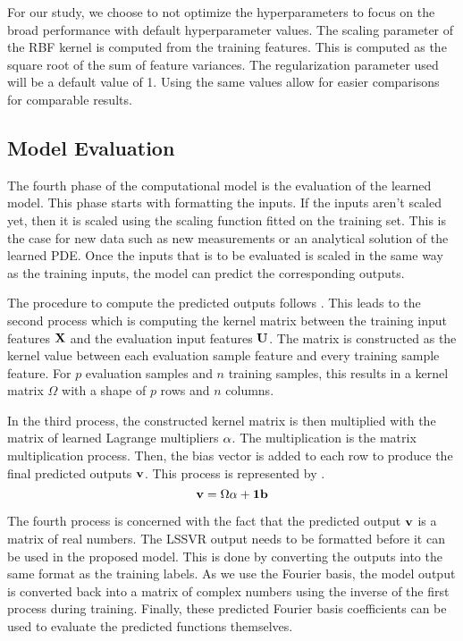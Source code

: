 For our study, we choose to not optimize the hyperparameters to focus on the broad performance with default hyperparameter values. The scaling parameter of the RBF kernel is computed from the training features. This is computed as the square root of the sum of feature variances. The regularization parameter used will be a default value of 1. Using the same values allow for easier comparisons for comparable results.

\subsection{Model Evaluation}
\noindent The fourth phase of the computational model is the evaluation of the learned model. This phase starts with formatting the inputs. If the inputs aren't scaled yet, then it is scaled using the scaling function fitted on the training set. This is the case for new data such as new measurements or an analytical solution of the learned PDE\@. Once the inputs that is to be evaluated is scaled in the same way as the training inputs, the model can predict the corresponding outputs.

The procedure to compute the predicted outputs follows . This leads to the second process which is computing the kernel matrix between the training input features \(\vb{X}\) and the evaluation input features \(\vb{U}\). The matrix is constructed as the kernel value between each evaluation sample feature and every training sample feature. For \(p \) evaluation samples and \(n \) training samples, this results in a kernel matrix \(\Omega \) with a shape of \(p \) rows and \(n \) columns.

In the third process, the constructed kernel matrix is then multiplied with the matrix of learned Lagrange multipliers \(\vb{\alpha}\). The multiplication is the matrix multiplication process. Then, the bias vector is added to each row to produce the final predicted outputs \(\vb{v}\). This process is represented by .
\begin{equation}
  \vb{v} = \Omega\vb{\alpha}+\vb{1}\vb{b} \label{eq:lssvr_prediction_vectorized}
\end{equation}

The fourth process is concerned with the fact that the predicted output \(\vb{v}\) is a matrix of real numbers. The LSSVR output needs to be formatted before it can be used in the proposed model. This is done by converting the outputs into the same format as the training labels. As we use the Fourier basis, the model output is converted back into a matrix of complex numbers using the inverse of the first process during training. Finally, these predicted Fourier basis coefficients can be used to evaluate the predicted functions themselves.

